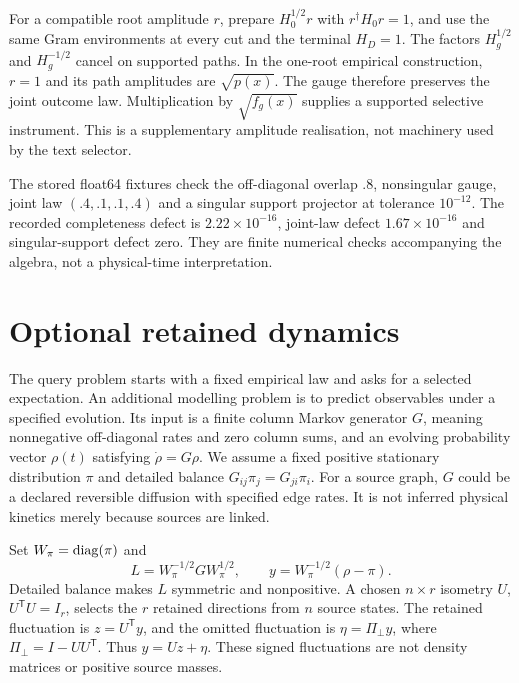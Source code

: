 For a compatible root amplitude \(r\), prepare \(H_0^{1/2}r\) with \(r^\dagger H_0r=1\), and use the same Gram environments at every cut and the terminal \(H_D=1\).
The factors \(H_g^{1/2}\) and \(H_g^{-1/2}\) cancel on supported paths.
In the one-root empirical construction, \(r=1\) and its path amplitudes are \(\sqrt{p(x)}\).
The gauge therefore preserves the joint outcome law.
Multiplication by \(\sqrt{f_g(x)}\) supplies a supported selective instrument.
This is a supplementary amplitude realisation, not machinery used by the text selector.

The stored float64 fixtures check the off-diagonal overlap .8, nonsingular gauge, joint law \((.4,.1,.1,.4)\) and a singular support projector at tolerance \(10^{-12}\).
The recorded completeness defect is \(2.22\times10^{-16}\), joint-law defect \(1.67\times10^{-16}\) and singular-support defect zero.
They are finite numerical checks accompanying the algebra, not a physical-time interpretation.

\section{Optional retained dynamics}
\label{app:dm-memory}
The query problem starts with a fixed empirical law and asks for a selected expectation.
An additional modelling problem is to predict observables under a specified evolution.
Its input is a finite column Markov generator \(G\), meaning nonnegative off-diagonal rates and zero column sums, and an evolving probability vector \(\rho(t)\) satisfying \(\dot\rho=G\rho\).
We assume a fixed positive stationary distribution \(\pi\) and detailed balance
\(G_{ij}\pi_j=G_{ji}\pi_i\).
For a source graph, \(G\) could be a declared reversible diffusion with specified edge rates.
It is not inferred physical kinetics merely because sources are linked.

Set \(W_\pi=\operatorname{diag}(\pi)\) and
\begin{equation}
 L=W_\pi^{-1/2}GW_\pi^{1/2},\qquad
 y=W_\pi^{-1/2}(\rho-\pi).
\end{equation}
Detailed balance makes \(L\) symmetric and nonpositive.
A chosen \(n\times r\) isometry \(U\), \(U^{\mathsf T}U=I_r\), selects the \(r\) retained directions from \(n\) source states.
The retained fluctuation is \(z=U^{\mathsf T}y\), and the omitted fluctuation is
\(\eta=\Pi_\perp y\), where \(\Pi_\perp=I-UU^{\mathsf T}\).
Thus \(y=Uz+\eta\).
These signed fluctuations are not density matrices or positive source masses.

